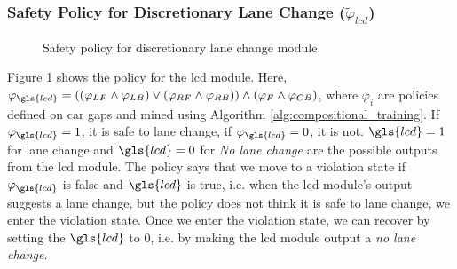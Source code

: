\subsubsection{Safety Policy for Discretionary Lane Change ($\tilde{\varphi}_{lcd}$)}
\label{sec:lcd_policy}


\begin{figure}[htbp]
 \caption{Safety policy for discretionary lane change module.}
    \label{fig:lcd_policy}
\end{figure}



Figure \ref{fig:lcd_policy} shows the policy for the \gls{lcd} module. Here, $ \varphi_{\gls{lcd}} = ((\varphi_{LF} \land \varphi_{LB}) \lor (\varphi_{RF} \land \varphi_{RB})) \land (\varphi_{F} \land \varphi_{CB}) $, where $\varphi_{i}$ are policies defined on car gaps and mined using Algorithm \ref{alg:compositional_training}. If $\varphi_{\gls{lcd}}=1$, it is safe to lane change, if $\varphi_{\gls{lcd}}=0$, it is not. $ \gls{lcd} = 1 $ for lane change and $\gls{lcd}=0$ for \textit{No lane change} are the possible outputs from the \gls{lcd} module. The policy says that we move to a violation state if $\varphi_{\gls{lcd}}$ is false and $\gls{lcd}$ is true, i.e. when the \gls{lcd} module's output suggests a lane change, but the policy does not think it is safe to lane change, we enter the violation state. Once we enter the violation state, we can recover by setting the $\gls{lcd}$ to 0, i.e. by making the \gls{lcd} module output a \textit{no lane change}.


